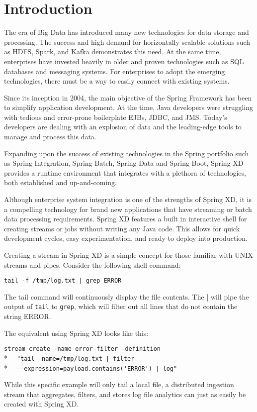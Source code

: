 \section{Introduction}

The era of Big Data has introduced many new technologies for data storage
and processing. The success and high demand for horizontally scalable
solutions such as HDFS\cite{hdfs}, Spark\cite{spark}, and Kafka\cite{kafka} demonstrates
this need.  At the same time, enterprises have invested heavily in older and proven
technologies such as SQL databases and messaging systems. For enterprises
to adopt the emerging technologies, there must be a way to easily
connect with existing systems.

Since its inception in 2004, the main objective of the Spring\cite{spring} Framework
has been to simplify application development. At the time, Java developers
were struggling with tedious and error-prone boilerplate EJBs\cite{ejb}, JDBC\cite{jdbc},
and JMS\cite{jms}. Today's developers are dealing with an explosion of data and the
leading-edge tools to manage and process this data.

Expanding upon the success of existing technologies in the Spring portfolio
such as Spring Integration\cite{spring-integration-reference},
Spring Batch\cite{spring-batch-reference}, Spring Data\cite{spring-data-reference} and
Spring Boot\cite{spring-boot-reference},
Spring XD provides a runtime environment that integrates with
a plethora of technologies, both established and up-and-coming.

Although enterprise system integration is one of the strengths of Spring XD,
it is a compelling technology for brand new applications that have streaming
or batch data processing requirements. Spring XD features a built in
interactive shell for creating streams or jobs without writing any Java code.
This allows for quick development cycles, easy experimentation, and ready
to deploy into production.

Creating a stream in Spring XD is a simple concept for those familiar with
UNIX streams and pipes. Consider the following shell command:

\verb;tail -f /tmp/log.txt | grep ERROR;

The tail command will continuously display the file contents. The |
will pipe the output of \texttt{tail} to \texttt{grep}, which will filter 
out all lines that do not contain the string ERROR.

The equivalent using Spring XD looks like this:

\verb;stream create -name error-filter -definition;\\*
\verb;  "tail -name=/tmp/log.txt | filter;\\*
\verb;  --expression=payload.contains('ERROR') | log";

While this specific example will only tail a local file, a distributed 
ingestion stream that aggregates, filters, and stores log file analytics
can just as easily be created with Spring XD.
